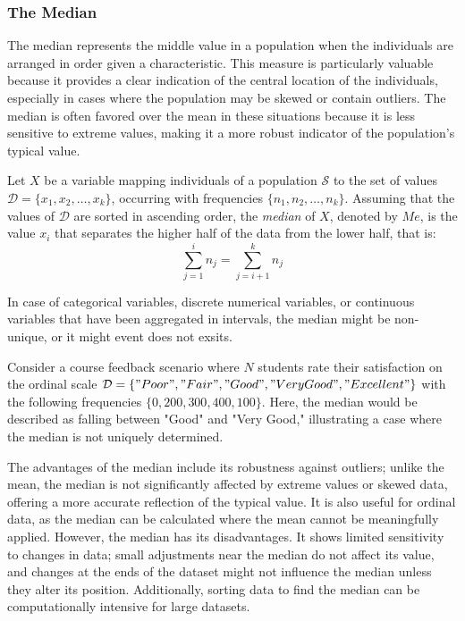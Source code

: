 
\subsubsection*{The Median}
\label{sec:median}

The median represents the middle value in a population when the individuals are arranged in order given a characteristic. This measure is particularly valuable because it provides a clear indication of the central location of the individuals, especially in cases where the population may be skewed or contain outliers. The median is often favored over the mean in these situations because it is less sensitive to extreme values, making it a more robust indicator of the population's typical value.

\begin{definition}
Let $X$ be a variable mapping individuals of a population $\mathcal{S}$ to the set of values $\mathcal{D} = \{x_1, x_2, \dots, x_k\}$, occurring with frequencies $\{n_1, n_2, \dots, n_k\}$. Assuming that the values of $\mathcal{D}$ are sorted in ascending order, the \emph{median} of $X$, denoted by $Me$, is the value $x_i$ that separates the higher half of the data from the lower half, that is:
\[
\sum_{j=1}^{i} n_j =  \sum_{j=i+1}^{k} n_j
\]
\end{definition}

In case of categorical variables, discrete numerical variables, or continuous variables that have been aggregated in intervals, the median might be non-unique, or it might event does not exsits.

\begin{example}
Consider a course feedback scenario where $N$ students rate their satisfaction on the ordinal scale $\mathcal{D} = \{"Poor", "Fair", "Good", "Very Good", "Excellent"\}$ with the following frequencies $\{0, 200, 300, 400, 100 \}$. Here, the median would be described as falling between "Good" and "Very Good," illustrating a case where the median is not uniquely determined.
\end{example}

The advantages of the median include its robustness against outliers; unlike the mean, the median is not significantly affected by extreme values or skewed data, offering a more accurate reflection of the typical value. It is also useful for ordinal data, as the median can be calculated where the mean cannot be meaningfully applied. However, the median has its disadvantages. It shows limited sensitivity to changes in data; small adjustments near the median do not affect its value, and changes at the ends of the dataset might not influence the median unless they alter its position. Additionally, sorting data to find the median can be computationally intensive for large datasets.

